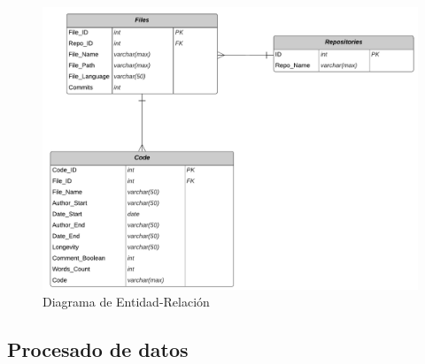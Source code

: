 \documentclass[a4paper, 12pt]{book}
\begin{document}
\begin{figure}
  \centering
  \includegraphics[width=14cm, keepaspectratio]{img/Diagrama_E-R.png}
  \caption{Diagrama de Entidad-Relación}
  \label{fig:entidad-relacion}
\end{figure}

\subsection{Procesado de datos}
\label{subsec:procesado}
\end{document}
